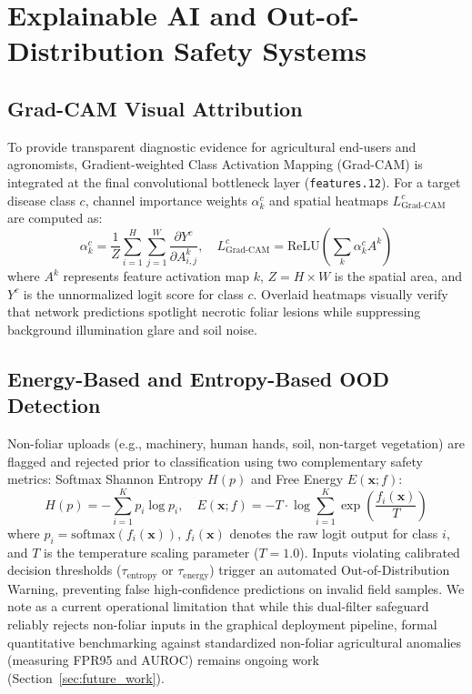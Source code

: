 \documentclass[conference]{IEEEtran}
\begin{document}
\section{Explainable AI and Out-of-Distribution Safety Systems}
\label{sec:xai_ood}

\subsection{Grad-CAM Visual Attribution}
To provide transparent diagnostic evidence for agricultural end-users and agronomists, Gradient-weighted Class Activation Mapping (Grad-CAM) is integrated at the final convolutional bottleneck layer (\texttt{features.12}). For a target disease class $c$, channel importance weights $\alpha_k^c$ and spatial heatmaps $L_{\text{Grad-CAM}}^c$ are computed as:
\begin{equation}
\alpha_k^c = \frac{1}{Z} \sum_{i=1}^{H} \sum_{j=1}^{W} \frac{\partial Y^c}{\partial A_{i,j}^k}, \quad L_{\text{Grad-CAM}}^c = \text{ReLU}\left(\sum_{k} \alpha_k^c A^k\right)
\label{eq:gradcam}
\end{equation}
where $A^k$ represents feature activation map $k$, $Z = H \times W$ is the spatial area, and $Y^c$ is the unnormalized logit score for class $c$. Overlaid heatmaps visually verify that network predictions spotlight necrotic foliar lesions while suppressing background illumination glare and soil noise.

\subsection{Energy-Based and Entropy-Based OOD Detection}
Non-foliar uploads (e.g., machinery, human hands, soil, non-target vegetation) are flagged and rejected prior to classification using two complementary safety metrics: Softmax Shannon Entropy $H(p)$ and Free Energy $E(\mathbf{x}; f)$:
\begin{equation}
H(p) = -\sum_{i=1}^{K} p_i \log p_i, \quad E(\mathbf{x}; f) = -T \cdot \log \sum_{i=1}^{K} \exp\left(\frac{f_i(\mathbf{x})}{T}\right)
\label{eq:ood}
\end{equation}
where $p_i = \text{softmax}(f_i(\mathbf{x}))$, $f_i(\mathbf{x})$ denotes the raw logit output for class $i$, and $T$ is the temperature scaling parameter ($T = 1.0$). Inputs violating calibrated decision thresholds ($\tau_{\text{entropy}}$ or $\tau_{\text{energy}}$) trigger an automated Out-of-Distribution Warning, preventing false high-confidence predictions on invalid field samples. We note as a current operational limitation that while this dual-filter safeguard reliably rejects non-foliar inputs in the graphical deployment pipeline, formal quantitative benchmarking against standardized non-foliar agricultural anomalies (measuring FPR95 and AUROC) remains ongoing work (Section~\ref{sec:future_work}).
\end{document}
